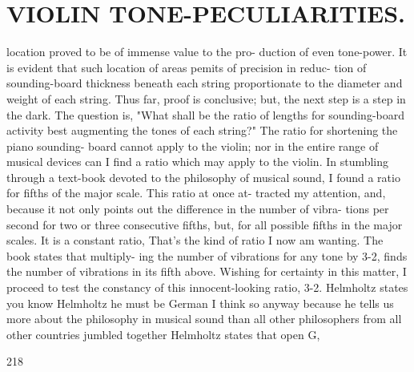 \documentclass{article}
\begin{document}
\section*{VIOLIN TONE-PECULIARITIES.}
location proved to be of immense value to the pro- duction of even tone-power. It is evident that such location of areas pemits of precision in reduc- tion of sounding-board thickness beneath each string proportionate to the diameter and weight of each string. Thus far, proof is conclusive; but, the next step is a step in the dark. The question is, "What shall be the ratio of lengths for sounding-board activity best augmenting the tones of each string?" The ratio for shortening the piano sounding- board cannot apply to the violin; nor in the entire range of musical devices can I find a ratio which may apply to the violin. In stumbling through a text-book devoted to the philosophy of musical sound, I found a ratio for fifths of the major scale. This ratio at once at- tracted my attention, and, because it not only points out the difference in the number of vibra- tions per second for two or three consecutive fifths, but, for all possible fifths in the major scales. It is a constant ratio, That's the kind of ratio I now am wanting. The book states that multiply- ing the number of vibrations for any tone by 3-2, finds the number of vibrations in its fifth above. Wishing for certainty in this matter, I proceed to test the constancy of this innocent-looking ratio, 3-2. Helmholtz states you know Helmholtz he must be German I think so anyway because he tells us more about the philosophy in musical sound than all other philosophers from all other countries jumbled together Helmholtz states that open G,

218
\end{document}
